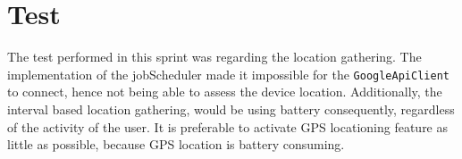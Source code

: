 \section{Test}\label{section:test}
The test performed in this sprint was regarding the location gathering.
The implementation of the jobScheduler made it impossible for the \texttt{GoogleApiClient} to connect, hence not being able to assess the device location.
Additionally, the interval based location gathering, would be using battery consequently, regardless of the activity of the user. 
It is preferable to activate GPS locationing feature as little as possible, because GPS location is battery consuming.

